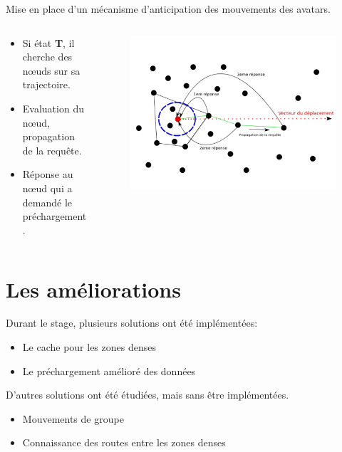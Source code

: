\documentclass{beamer}
\begin{document}
  \begin{frame}
	Mise en place d'un mécanisme d'anticipation des mouvements des avatars.
	\begin{columns}
	  \begin{column}{5cm}
		\begin{itemize}
		  \item Si état \textbf{T}, il cherche des nœuds sur sa trajectoire.
		  \item Evaluation du nœud, propagation de la requête.
		  \item Réponse au nœud qui a demandé le préchargement.
		\end{itemize}
	  \end{column}
	\begin{column}{5cm}
	\begin{figure}
        \includegraphics[scale=0.1]{./Ressources/Images/propagation_algo.png}\\
        \label{Propa_Algo}
        \end{figure}
	\end{column}
	\end{columns}
  \end{frame}

  \section{Les améliorations}
  \begin{frame}
	Durant le stage, plusieurs solutions ont été implémentées:
	\begin{itemize}
		\pause\item Le cache pour les zones denses
		\pause\item Le préchargement amélioré des données
	\end{itemize}
	\pause D'autres solutions ont été étudiées, mais sans être implémentées.
	\begin{itemize}
		\item Mouvements de groupe
		\item Connaissance des routes entre les zones denses
	\end{itemize}
  \end{frame}
\end{document}
